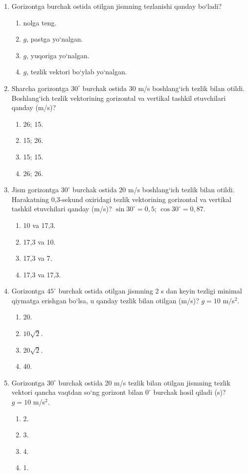 \begin{enumerate}
\item Gorizontga burchak ostida otilgan jismning tezlanishi qanday bo‘ladi?
\begin{enumerate}[label=\Alph*)]
\item nolga teng.
\item $g$, pastga yo‘nalgan.
\item $g$, yuqoriga yo‘nalgan.
\item $g$, tezlik vektori bo‘ylab yo‘nalgan.
\end{enumerate}

\item Sharcha gorizontga $30^\circ$ burchak ostida 30 m/s boshlang‘ich tezlik bilan otildi. Boshlang‘ich tezlik vektorining gorizontal va vertikal tashkil etuvchilari qanday (m/s)?
\begin{enumerate}[label=\Alph*)]
\item 26; 15.
\item 15; 26.
\item 15; 15.
\item 26; 26.
\end{enumerate}

\item Jism gorizontga $30^\circ$ burchak ostida 20 m/s boshlang‘ich tezlik bilan otildi. Harakatning 0,3-sekund oxiridagi tezlik vektorining gorizontal va vertikal tashkil etuvchilari qanday (m/s)? $\sin30^\circ=0,5$; $\cos30^\circ=0,87$.
\begin{enumerate}[label=\Alph*)]
\item 10 va 17,3.
\item 17,3 va 10.
\item 17,3 va 7.
\item 17,3 va 17,3.
\end{enumerate}


\item Gorizontga $45^\circ$ burchak ostida otilgan jismning 2 s dan keyin tezligi minimal qiymatga erishgan bo‘lsa, u qanday tezlik bilan otilgan (m/s)? $g=10$ m/s$^2$.
\begin{enumerate}[label=\Alph*)]
\item 20.
\item $10\sqrt{2}$.
\item $20\sqrt{2}$.
\item 40.
\end{enumerate}

\item Gorizontga $30^\circ$ burchak ostida 20 m/s tezlik bilan otilgan jismning tezlik vektori qancha vaqtdan so‘ng gorizont bilan $0^\circ$ burchak hosil qiladi (s)? $g=10$ m/s$^2$.
\begin{enumerate}[label=\Alph*)]
\item 2.
\item 3.
\item 4.
\item 1.
\end{enumerate}


\end{enumerate}
